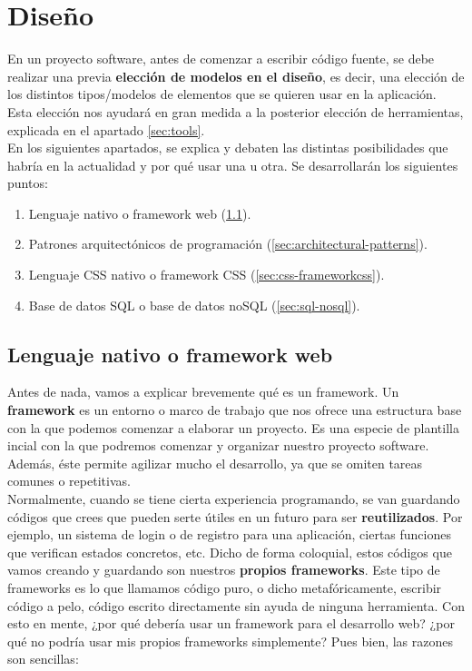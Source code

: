 \chapter{Diseño} \label{ch:design}
En un proyecto software, antes de comenzar a escribir código fuente, se debe realizar una
previa \textbf{elección de modelos en el diseño}, es decir, una elección de los distintos 
tipos/modelos de elementos que se quieren usar en la aplicación. Esta elección nos ayudará
en gran medida a la posterior elección de herramientas, explicada en el apartado
\ref{sec:tools}.\\

En los siguientes apartados, se explica y debaten las distintas posibilidades que habría en
la actualidad y por qué usar una u otra. Se desarrollarán los siguientes puntos:

    \begin{enumerate}
        \item Lenguaje nativo o framework web (\ref{sec:language-webframework}).
        \item Patrones arquitectónicos de programación (\ref{sec:architectural-patterns}).
        \item Lenguaje CSS nativo o framework CSS (\ref{sec:css-frameworkcss}).
        \item Base de datos SQL o base de datos noSQL (\ref{sec:sql-nosql}).
    \end{enumerate}

\section{Lenguaje nativo o framework web} \label{sec:language-webframework}
Antes de nada, vamos a explicar brevemente qué es un framework. Un \textbf{framework} es
un entorno o marco de trabajo que nos ofrece una estructura base con la que podemos
comenzar a elaborar un proyecto. Es una especie de plantilla incial con la que podremos
comenzar y organizar nuestro proyecto software. Además, éste permite agilizar mucho
el desarrollo, ya que se omiten tareas comunes o repetitivas.\\

Normalmente, cuando se tiene cierta experiencia programando, se van guardando códigos que
crees que pueden serte útiles en un futuro para ser \textbf{reutilizados}. Por ejemplo, un
sistema de login o de registro para una aplicación, ciertas funciones que verifican estados
concretos, etc. Dicho de forma coloquial, estos códigos que vamos creando y guardando son
nuestros \textbf{propios frameworks}. Este tipo de frameworks es lo que llamamos código
puro, o dicho metafóricamente, escribir código a pelo, código escrito directamente sin
ayuda de ninguna herramienta. Con esto en mente, ¿por qué debería usar un framework para
el desarrollo web? ¿por qué no podría usar mis propios frameworks simplemente? Pues bien,
las razones son sencillas:


